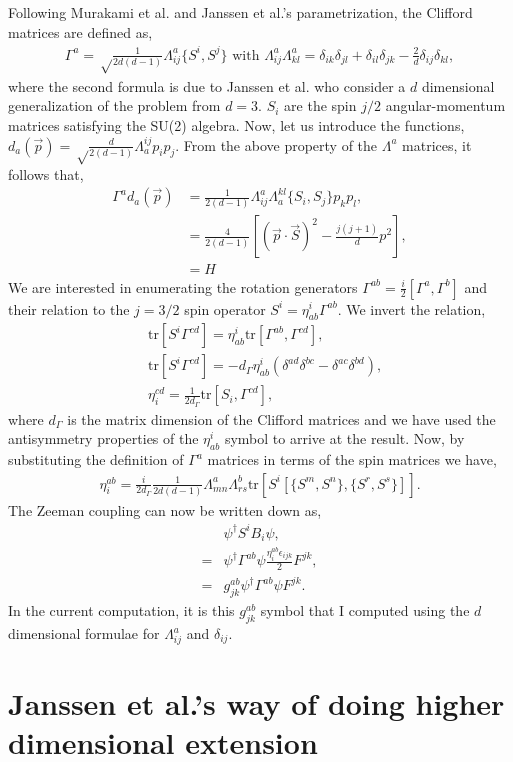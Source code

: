 \documentclass[notitlepage,onecolumn,showpacs,aps,prb]{revtex4-2}
\newcommand{\tr}{\text{tr}}
\newcommand{\beq}{\begin{equation}\begin{aligned}}
\newcommand{\eeq}{\end{aligned}\end{equation}}
\begin{document}
Following Murakami et al. \cite{murakami04} and 
Janssen et al.'s \cite{janssen15} parametrization, the Clifford matrices are
defined as,
\beq
\Gamma^a= \sqrt\frac{1}{2d(d-1)}\Lambda^a_{ij}\{S^i,S^j\} \text{ with }
\Lambda^a_{ij}\Lambda^a_{kl}=\delta_{ik}\delta_{jl}+\delta_{il}\delta_{jk}-\frac{2}{d}\delta_{ij}\delta_{kl},
\eeq
where the second formula is due to Janssen et al. who consider a $d$ dimensional generalization
of the problem from $d=3$. $S_i$ are the spin $j/2$ angular-momentum matrices satisfying the
SU(2) algebra. Now, let us introduce the functions, $d_a(\vec p)=\sqrt\frac{d}{2(d-1)}\Lambda_a^{ij}p_i p_j$. 
From the above property of the $\Lambda^a$ matrices, it 
follows that,
\beq
\Gamma^a d_a(\vec p)
&=\frac{1}{2(d-1)}\Lambda^a_{ij}\Lambda_a^{kl}\{S_i,S_j\}p_k p_l,\\
&=\frac{4}{2(d-1)}
\left[\left(\vec p\cdot\vec S\right)^2-\frac{j(j+1)}{d}p^2\right],\\
&=H
\eeq
We are interested in enumerating the rotation generators $\Gamma^{ab}=\frac{i}{2}[\Gamma^a,\Gamma^b]$ 
and their relation to the $j=3/2$ spin operator $S^i=\eta^i_{ab}\Gamma^{ab}$. We invert the relation,
\beq
&\tr[S^i\Gamma^{cd}]=\eta^i_{ab}\tr[\Gamma^{ab},\Gamma^{cd}],\\
&\tr[S^i\Gamma^{cd}]=-d_\Gamma\eta^i_{ab}\left(\delta^{ad}\delta^{bc}-\delta^{ac}\delta^{bd}\right),\\
&\eta^{cd}_i=\frac{1}{2d_\Gamma}\tr[S_i,\Gamma^{cd}],
\eeq
where $d_\Gamma$ is the matrix dimension of the Clifford matrices and we have used the antisymmetry
properties of the $\eta^i_{ab}$ symbol to arrive at the result. Now, by substituting the definition of
$\Gamma^a$ matrices in terms of the spin matrices we have,
\beq
\eta_i^{ab}=\frac{i}{2d_\Gamma}\frac{1}{2d(d-1)}
\Lambda^a_{mn}\Lambda^b_{rs}\tr\left[S^i[\{S^m,S^n\},\{S^r,S^s\}]\right].
\eeq
The Zeeman coupling can now be written down as,
\beq
&\psi^\dagger S^i B_i\psi,\\
=&\psi^\dagger\Gamma^{ab}\psi\frac{\eta^{ab}_i\epsilon_{ijk}}{2}F^{jk},\\
=&
g^{ab}_{jk}
\psi^\dagger\Gamma^{ab}\psi F^{jk}.
\eeq
In the current computation, it is this $g^{ab}_{jk}$ symbol that I computed using the $d$ dimensional
formulae for $\Lambda^a_{ij}$ and $\delta_{ij}$.

\section{Janssen et al.'s \cite{janssen15} way of doing higher dimensional extension}
\end{document}
